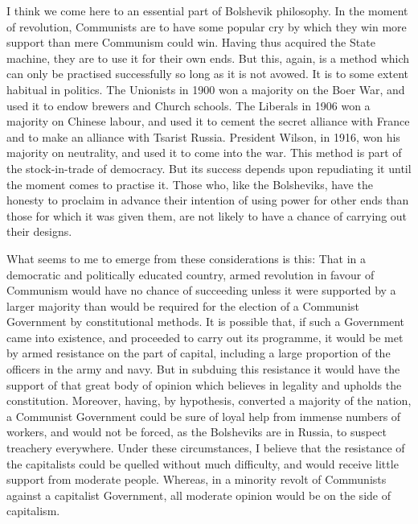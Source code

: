 I think we come here to an essential part of Bolshevik philosophy. In the moment of revolution, Communists are to have some popular cry by which they win more support than mere Communism could win. Having thus acquired the State machine, they are to use it for their own ends. But this, again, is a method which can only be practised successfully so long as it is not avowed. It is to some extent habitual in politics. The Unionists in 1900 won a majority on the Boer War, and used it to endow brewers and Church schools. The Liberals in 1906 won a majority on Chinese labour, and used it to cement the secret alliance with France and to make an alliance with Tsarist Russia. President Wilson, in 1916, won his majority on neutrality, and used it to come into the war. This method is part of the stock-in-trade of democracy. But its success depends upon repudiating it until the moment comes to practise it. Those who, like the Bolsheviks, have the honesty to proclaim in advance their intention of using power for other ends than those for which it was given them, are not likely to have a chance of carrying out their designs.

What seems to me to emerge from these considerations is this: That in a democratic and politically educated country, armed revolution in favour of Communism would have no chance of succeeding unless it were supported by a larger majority than would be required for the election of a Communist Government by constitutional methods. It is possible that, if such a Government came into existence, and proceeded to carry out its programme, it would be met by armed resistance on the part of capital, including a large proportion of the officers in the army and navy. But in subduing this resistance it would have the support of that great body of opinion which believes in legality and upholds the constitution. Moreover, having, by hypothesis, converted a majority of the nation, a Communist Government could be sure of loyal help from immense numbers of workers, and would not be forced, as the Bolsheviks are in Russia, to suspect treachery everywhere. Under these circumstances, I believe that the resistance of the capitalists could be quelled without much difficulty, and would receive little support from moderate people. Whereas, in a minority revolt of Communists against a capitalist Government, all moderate opinion would be on the side of capitalism.

